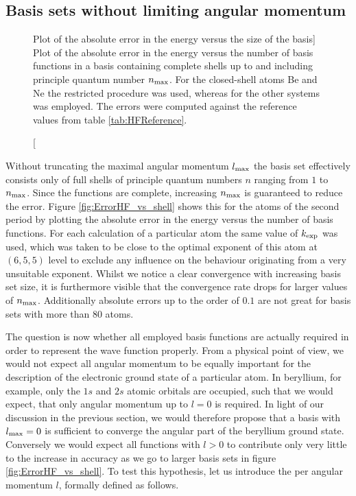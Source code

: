 %
%
\subsection{Basis sets without limiting angular momentum}
\begin{figure}
	\centering
	\caption
	[Plot of the absolute error in the \HF energy versus the size of the \CS basis]
	{
		Plot of the absolute error in the \HF energy versus the number of basis
		functions in a \CS basis containing complete shells
		up to and including principle quantum number $n_\text{max}$.
		For the closed-shell atoms Be and Ne
		the restricted \HF procedure was used,
		whereas for the other systems \UHF was employed.
		The errors were computed against the reference
		values from table \vref{tab:HFReference}.
}
	\label{fig:ErrorHF_vs_shell}
\end{figure}
Without truncating the maximal angular momentum $l_\text{max}$
the \CS basis set effectively consists only of full shells
of principle quantum numbers $n$ ranging from $1$ to $n_\text{max}$.
Since the \CS functions are complete, increasing $n_\text{max}$ is guaranteed
to reduce the error.
Figure \vref{fig:ErrorHF_vs_shell} shows this for the atoms of the second period
by plotting the absolute error in the \HF energy
versus the number of basis functions.
For each calculation of a particular atom the same value of $k_\text{exp}$ was used,
which was taken to be close to the optimal exponent of this atom at $(6,5,5)$ level
to exclude any influence on the behaviour originating from a
very unsuitable exponent.
Whilst we notice a clear convergence with increasing basis set size,
it is furthermore visible that the convergence rate drops
for larger values of $n_\text{max}$.
Additionally absolute errors up to the order of $0.1$ are not great
for basis sets with more than $80$ atoms.

The question is now whether all employed
basis functions are actually required
in order to represent the wave function properly.
From a physical point of view,
we would not expect all angular momentum to be equally important
for the description of the electronic ground state of a particular atom.
In beryllium, for example, only the $1s$ and $2s$ atomic orbitals are occupied,
such that we would expect, that only angular momentum up to $l = 0$ is required.
In light of our discussion in the previous section,
we would therefore propose that a basis with $l_\text{max} = 0$ is sufficient
to converge the angular part of the beryllium ground state.
Conversely we would expect all \CS functions with $l > 0$
to contribute only very little to the increase in accuracy
as we go to larger basis sets in figure \vref{fig:ErrorHF_vs_shell}.
To test this hypothesis, let us introduce the
 per angular momentum $l$,
formally defined as follows.

